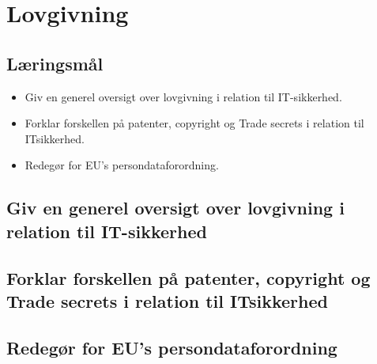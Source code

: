 \section{Lovgivning}

\subsection{Læringsmål}

\begin{itemize}
	\item Giv en generel oversigt over lovgivning i relation til IT-sikkerhed.
	\item Forklar forskellen på patenter, copyright og Trade secrets i relation til ITsikkerhed.
	\item Redegør for EU's persondataforordning.
\end{itemize}

\subsection{Giv en generel oversigt over lovgivning i relation til IT-sikkerhed}
\subsection{Forklar forskellen på patenter, copyright og Trade secrets i relation til ITsikkerhed}
\subsection{Redegør for EU's persondataforordning}
